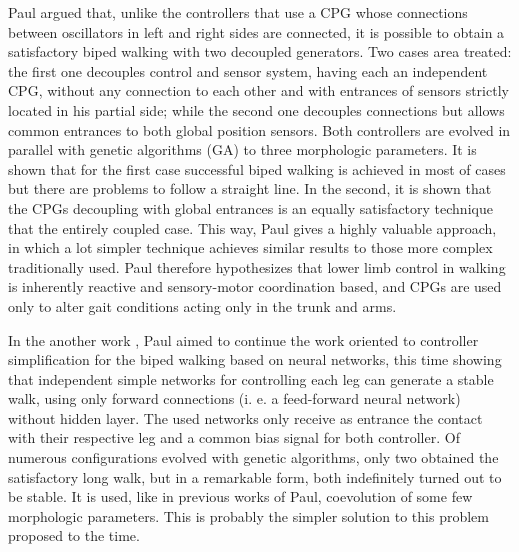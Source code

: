 Paul \cite{Paul03Bilateral} argued that, unlike the controllers that use a CPG whose connections between oscillators in left and right sides are connected, it is possible to obtain a satisfactory biped walking with two decoupled generators. Two cases area treated: the first one decouples control and sensor system, having each an independent CPG, without any connection to each other and with entrances of sensors strictly located in his partial side; while the second one decouples connections but allows common entrances to both global position sensors. Both controllers are evolved in parallel with genetic algorithms (GA) to three morphologic parameters. It is shown that for the first case successful biped walking is achieved in most of cases but there are problems to follow a straight line. In the second, it is shown that the CPGs decoupling with global entrances is an equally satisfactory technique that the entirely coupled case. This way, Paul gives a highly valuable approach, in which a lot simpler technique achieves similar results to those more complex traditionally used. Paul therefore hypothesizes that lower limb control in walking is inherently reactive and sensory-motor coordination based, and CPGs are used only to alter gait conditions acting only in the trunk and arms.


In the another work \cite{Paul04Sensorimotor}, Paul aimed to continue the work oriented to controller simplification for the biped walking based on neural networks, this time showing that independent simple networks for controlling each leg can generate a stable walk, using only forward connections (i. e. a feed-forward neural network) without hidden layer. The used networks only receive as entrance the contact with their respective leg and a common  bias signal for both controller. Of numerous configurations evolved with genetic algorithms, only two obtained the satisfactory long walk, but in a remarkable form, both indefinitely turned out to be stable. It is used, like in previous works of Paul, coevolution of some few morphologic parameters. This is probably the simpler solution to this problem proposed to the time.


